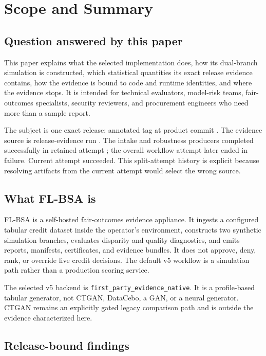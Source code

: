 \section{Scope and Summary}

\subsection{Question answered by this paper}

This paper explains what the selected \ProductReleaseTag{} implementation does, how its dual-branch
simulation is constructed, which statistical quantities its exact release evidence contains, how
the evidence is bound to code and runtime identities, and where the evidence stops. It is intended
for technical evaluators, model-risk teams, fair-outcomes specialists, security reviewers, and
procurement engineers who need more than a sample report.

The subject is one exact release: annotated tag \ProductReleaseTag{} at product commit
\IdentityText{\ProductCommitRaw}. The evidence source is release-evidence run \EvidenceRunRaw.
The intake and robustness producers completed successfully in retained attempt
\EvidenceSourceAttemptRaw; the overall workflow attempt later ended in failure. Current attempt
\EvidenceCurrentAttemptRaw{} succeeded. This split-attempt history is explicit because resolving
artifacts from the current attempt would select the wrong source.

\subsection{What FL-BSA is}

FL-BSA is a self-hosted fair-outcomes evidence appliance. It ingests a configured tabular credit
dataset inside the operator's environment, constructs two synthetic simulation branches, evaluates
disparity and quality diagnostics, and emits reports, manifests, certificates, and evidence bundles.
It does not approve, deny, rank, or override live credit decisions. The default v5 workflow is a
simulation path rather than a production scoring service.

The selected v5 backend is \texttt{first\_party\_evidence\_native}. It is a profile-based tabular
generator, not CTGAN, DataCebo, a GAN, or a neural generator. CTGAN remains an explicitly gated
legacy comparison path and is outside the evidence characterized here.

\subsection{Release-bound findings}


